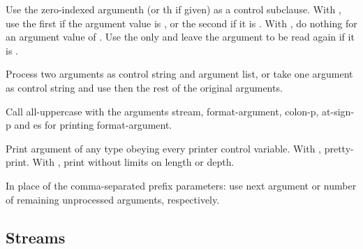 \begin{LIST}{1cm}
\begin{LIST}{.5cm}
    {%
      Use the zero-indexed argumenth (or
      th if given)  as a  control subclause.
      With \kwd{:}, use the first  if the argument value is
      \NIL, or the second  if it is \T. With , do nothing
      for an argument value of \NIL. Use the only  and leave
      the argument to be read again if it is \T.
    }

    {%
      Process two arguments as control string and argument list, or
      take one argument as control string and use then the rest of the
      original arguments.
    }

    {%
      Call all-uppercase  with the
      arguments stream, format-ar\-gu\-ment, colon-p, at-sign-p and
      es for printing format-argument.
    }

    {%
      Print argument of any type obeying every printer control
      variable. With \kwd{:}, pretty-print. With , print
      without limits on length or depth.
    }

    {\index{\#}
      In place of the comma-separated prefix parameters: use next
      argument or number of remaining unprocessed arguments, respectively.
    }

  \end{LIST}

\end{LIST}


\subsection{Streams} 


